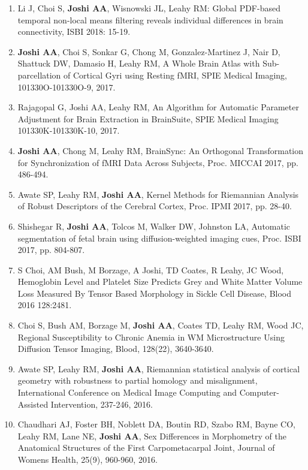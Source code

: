 \documentclass[overlapped,line,letterpaper]{res}
\begin{document}
\begin{resume}
\begin{enumerate}
    \item Li J, Choi S, \textbf{Joshi AA}, Wisnowski JL, Leahy RM: {Global PDF-based temporal non-local means filtering reveals individual differences in brain connectivity},  ISBI 2018: 15-19.

    \item \textbf{Joshi AA}, Choi S, Sonkar G, Chong M,  Gonzalez-Martinez J, Nair D, Shattuck DW,  Damasio H, Leahy RM, {A Whole Brain Atlas with Sub-parcellation of Cortical Gyri using Resting fMRI}, SPIE Medical Imaging, 101330O-101330O-9, 2017.

    \item Rajagopal G, Joshi AA, Leahy RM, {An Algorithm for Automatic Parameter Adjustment for Brain Extraction in BrainSuite},  SPIE Medical Imaging 101330K-101330K-10, 2017.

    \item \textbf{Joshi AA}, Chong M, Leahy RM, {BrainSync: An Orthogonal Transformation for Synchronization of fMRI Data Across Subjects}, Proc. MICCAI 2017, pp. 486-494.

    \item Awate SP, Leahy RM, \textbf{Joshi AA}, {Kernel Methods for Riemannian Analysis of Robust Descriptors of the Cerebral Cortex}, Proc. IPMI 2017, pp. 28-40.

    \item Shishegar R, \textbf{Joshi AA}, Tolcos M,  Walker DW, Johnston LA, Automatic segmentation of fetal brain using diffusion-weighted imaging cues, Proc. ISBI 2017, pp. 804-807.

    \item S Choi, AM Bush, M Borzage, A Joshi, TD Coates, R Leahy, JC Wood, {Hemoglobin Level and Platelet Size Predicts Grey and White Matter Volume Loss Measured By Tensor Based Morphology in Sickle Cell Disease}, Blood 2016 128:2481.

    \item Choi S, Bush AM, Borzage M, \textbf{Joshi AA}, Coates TD, Leahy RM, Wood JC, {Regional Susceptibility to Chronic Anemia in WM Microstructure Using Diffusion Tensor Imaging}, Blood, 128(22), 3640-3640. 

    \item Awate SP, Leahy RM, \textbf{Joshi AA}, {Riemannian statistical analysis of cortical geometry with robustness to partial homology and misalignment}, International Conference on Medical Image Computing and Computer-Assisted Intervention, 237-246, 2016.

    \item Chaudhari AJ, Foster BH, Noblett DA, Boutin RD, Szabo RM, Bayne CO, Leahy RM, Lane NE, \textbf{Joshi AA}, {Sex Differences in Morphometry of the Anatomical Structures of the First Carpometacarpal Joint}, Journal of Womens Health, 25(9), 960-960, 2016.


\end{enumerate}
\end{resume}
\end{document}
